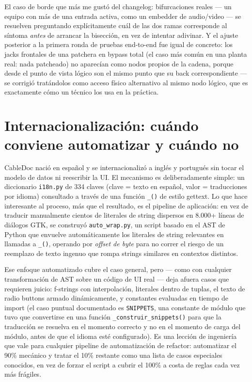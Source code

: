 \documentclass[11pt,twocolumn]{article}
\begin{document}
El caso de borde que más me gustó del changelog: bifurcaciones reales --- un equipo con más de una entrada activa, como un embedder de audio/video --- se resuelven preguntando explícitamente cuál de las dos ramas corresponde al síntoma \emph{antes} de arrancar la bisección, en vez de intentar adivinar. Y el ajuste posterior a la primera ronda de pruebas end-to-end fue igual de concreto: los jacks frontales de una patchera en bypass total (el caso más común en una planta real: nada patcheado) no aparecían como nodos propios de la cadena, porque desde el punto de vista lógico son el mismo punto que su back correspondiente --- se corrigió tratándolos como acceso físico alternativo al mismo nodo lógico, que es exactamente cómo un técnico los usa en la práctica.

\section{Internacionalización: cuándo conviene automatizar y cuándo no}

CableDoc nació en español y se internacionalizó a inglés y portugués sin tocar el modelo de datos ni reescribir la UI. El mecanismo es deliberadamente simple: un diccionario \texttt{i18n.py} de 334 claves (clave = texto en español, valor = traducciones por idioma) consultado a través de una función \texttt{\_()} de estilo gettext. Lo que hace interesante al proceso, más que el resultado, es el pipeline de aplicación: en vez de traducir manualmente cientos de literales de string dispersos en 8.000+ líneas de diálogos GTK, se construyó \texttt{auto\_wrap.py}, un script basado en el AST de Python que envuelve automáticamente los literales de string relevantes en llamadas a \texttt{\_()}, operando por \emph{offset de byte} para no correr el riesgo de un reemplazo de texto ingenuo que rompa strings similares en contextos distintos.

Ese enfoque automatizado cubre el caso general, pero --- como con cualquier transformación de AST sobre un código de UI real --- deja afuera casos que requieren juicio: f-strings con interpolación, literales dentro de tuplas, el texto de radio buttons armado dinámicamente, y constantes evaluadas en tiempo de import (el caso puntual documentado es \texttt{SNIPPETS}, una constante de módulo que tuvo que convertirse en una función \texttt{\_construir\_snippets()} para que la traducción se resuelva en el momento correcto y no en el momento de carga del módulo, antes de que el idioma esté configurado). Es una lección de ingeniería que vale para cualquier pipeline de automatización de refactor: automatizar el 90\% mecánico y tratar el 10\% restante como una lista de casos especiales conocidos, en vez de forzar el script a cubrir el 100\% a costa de reglas cada vez más frágiles.
\end{document}
